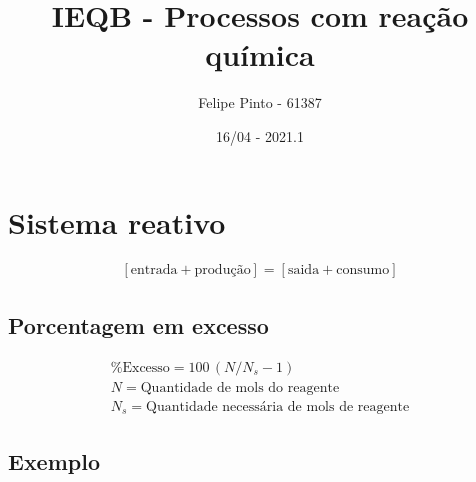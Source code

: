 \documentclass[12pt]{article}
\begin{document}
\title{\bfseries\color{DarkGreen!75!}%
	IEQB - Processos com reação química%
}
\author{Felipe Pinto - 61387}
\date{16/04 - 2021.1}

\maketitle
\tableofcontents
\break

\section{Sistema reativo}
\begin{align*}
&
	[\text{entrada} + \text{produção}] 
	= [\text{saida} + \text{consumo}]
&
\end{align*}

\subsection{Porcentagem em excesso}
\begin{align*}
&
	\%\text{Excesso} = 100\,(N/N_s - 1)
	&\\&
	N = \text{Quantidade de mols do reagente}
	&\\&
	N_s = \text{Quantidade necessária de mols de reagente}
&
\end{align*}

\subsection{Exemplo }

\end{document}
